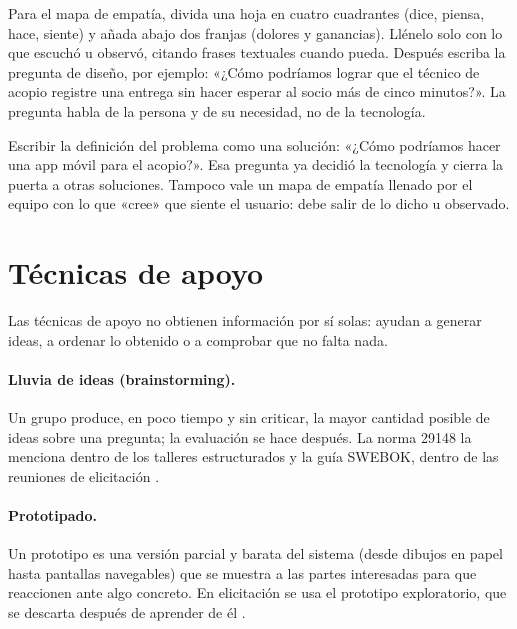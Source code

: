 \documentclass[11pt,a4paper,oneside]{report}
\begin{document}
\begin{enlapractica}
	Para el mapa de empatía, divida una hoja en cuatro cuadrantes (dice, piensa, hace, siente) y añada abajo dos franjas (dolores y ganancias). Llénelo solo con lo que escuchó u observó, citando frases textuales cuando pueda. Después escriba la pregunta de diseño, por ejemplo: «¿Cómo podríamos lograr que el técnico de acopio registre una entrega sin hacer esperar al socio más de cinco minutos?». La pregunta habla de la persona y de su necesidad, no de la tecnología.
\end{enlapractica}

\begin{cuidado}
	Escribir la definición del problema como una solución: «¿Cómo podríamos hacer una app móvil para el acopio?». Esa pregunta ya decidió la tecnología y cierra la puerta a otras soluciones. Tampoco vale un mapa de empatía llenado por el equipo con lo que «cree» que siente el usuario: debe salir de lo dicho u observado.
\end{cuidado}

\section{Técnicas de apoyo}

Las técnicas de apoyo no obtienen información por sí solas: ayudan a generar ideas, a ordenar lo obtenido o a comprobar que no falta nada.

\paragraph{Lluvia de ideas (brainstorming).} Un grupo produce, en poco tiempo y sin criticar, la mayor cantidad posible de ideas sobre una pregunta; la evaluación se hace después. La norma 29148 la menciona dentro de los talleres estructurados \citep{iso29148_2018} y la guía SWEBOK, dentro de las reuniones de elicitación \citep{swebok_v4_2024}.

\paragraph{Prototipado.} Un prototipo es una versión parcial y barata del sistema (desde dibujos en papel hasta pantallas navegables) que se muestra a las partes interesadas para que reaccionen ante algo concreto. En elicitación se usa el prototipo exploratorio, que se descarta después de aprender de él \citep{swebok_v4_2024,wiegers_beatty_2013}.
\end{document}
